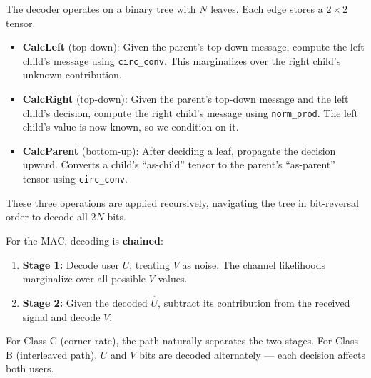 \documentclass[11pt]{article}
\begin{document}
\begin{concept}[title=3. CalcLeft / CalcRight / CalcParent]
The decoder operates on a binary tree with $N$ leaves. Each edge stores a $2 \times 2$ tensor.

\begin{itemize}[nosep]
  \item \textbf{CalcLeft} (top-down): Given the parent's top-down message, compute the left child's message using \texttt{circ\_conv}. This marginalizes over the right child's unknown contribution.
  \item \textbf{CalcRight} (top-down): Given the parent's top-down message and the left child's decision, compute the right child's message using \texttt{norm\_prod}. The left child's value is now known, so we condition on it.
  \item \textbf{CalcParent} (bottom-up): After deciding a leaf, propagate the decision upward. Converts a child's ``as-child'' tensor to the parent's ``as-parent'' tensor using \texttt{circ\_conv}.
\end{itemize}

These three operations are applied recursively, navigating the tree in bit-reversal order to decode all $2N$ bits.
\end{concept}

\begin{concept}[title=4. Chained Decoding (Two-Stage)]
For the MAC, decoding is \textbf{chained}:
\begin{enumerate}[nosep]
  \item \textbf{Stage 1:} Decode user $U$, treating $V$ as noise. The channel likelihoods marginalize over all possible $V$ values.
  \item \textbf{Stage 2:} Given the decoded $\hat{U}$, subtract its contribution from the received signal and decode $V$.
\end{enumerate}
For Class C (corner rate), the path naturally separates the two stages.
For Class B (interleaved path), $U$ and $V$ bits are decoded alternately --- each decision affects both users.
\end{concept}
\end{document}
